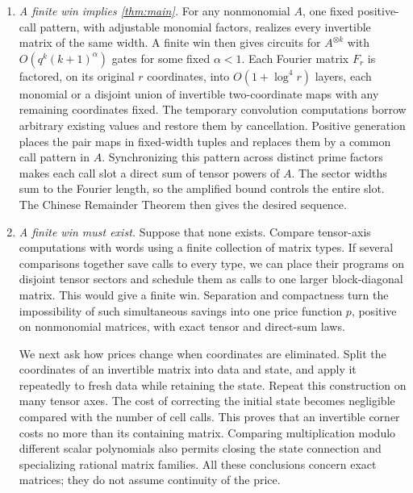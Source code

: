 \begin{enumerate}[leftmargin=*,label=\textup{(\roman*)}]
\item \emph{A finite win implies \cref{thm:main}.}
For any nonmonomial $A$, one fixed positive-call pattern, with adjustable
monomial factors, realizes every invertible matrix of the same width.
A finite win then gives circuits for $A^{\otimes k}$ with
$O(q^k(k+1)^\alpha)$ gates for some fixed $\alpha<1$.
Each Fourier matrix $F_r$ is factored, on its original $r$ coordinates,
into $O(1+\log^4 r)$ layers, each monomial or a disjoint union of
invertible two-coordinate maps with any remaining coordinates fixed.
The temporary convolution computations
borrow arbitrary existing values and restore them by cancellation.
Positive generation places the pair maps in fixed-width tuples and
replaces them by a common call pattern in $A$. Synchronizing this pattern
across distinct prime factors makes each call slot a direct sum of
tensor powers of $A$. The sector widths sum to the Fourier length, so
the amplified bound controls the entire slot. The Chinese Remainder
Theorem then gives the desired sequence.

\item \emph{A finite win must exist.}
Suppose that none exists. Compare tensor-axis computations with words
using a finite collection of matrix types. If several comparisons
together save calls to every type, we can place their programs on
disjoint tensor sectors and schedule them as calls to one larger
block-diagonal matrix. This would give a finite win. Separation and
compactness turn the impossibility of such simultaneous savings into
one price function $p$, positive on nonmonomial matrices, with exact tensor
and direct-sum laws.

We next ask how prices change when coordinates are eliminated. Split
the coordinates of an invertible matrix into data and state, and apply
it repeatedly to fresh data while retaining the state. Repeat this
construction on many tensor axes. The cost of correcting the initial
state becomes negligible compared with the number of cell calls. This
proves that an invertible corner costs no more than its
containing matrix. Comparing multiplication modulo different scalar
polynomials also permits closing the state connection and specializing
rational matrix families. All these conclusions concern exact matrices;
they do not assume continuity of the price.


\end{enumerate}
